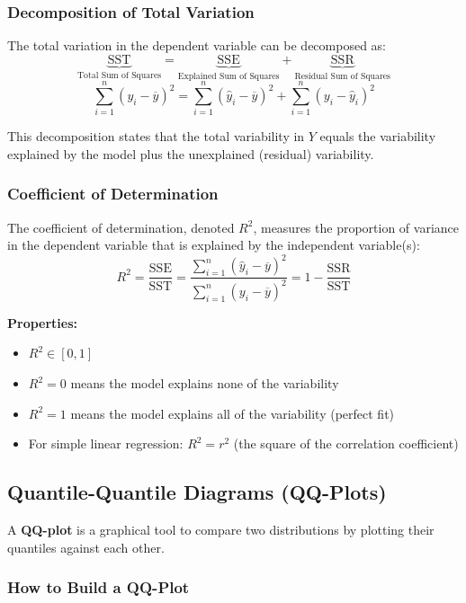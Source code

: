 \documentclass{article}
\begin{document}
\subsubsection{Decomposition of Total Variation}

The total variation in the dependent variable can be decomposed as:
\[
\underbrace{\text{SST}}_{\text{Total Sum of Squares}} = \underbrace{\text{SSE}}_{\text{Explained Sum of Squares}} + \underbrace{\text{SSR}}_{\text{Residual Sum of Squares}}
\]
\[
\sum_{i=1}^{n}(y_i - \overline{y})^2 = \sum_{i=1}^{n}(\hat{y}_i - \overline{y})^2 + \sum_{i=1}^{n}(y_i - \hat{y}_i)^2
\]

This decomposition states that the total variability in $Y$ equals the variability explained by the model plus the unexplained (residual) variability.

\subsubsection{Coefficient of Determination}

The coefficient of determination, denoted $R^2$, measures the proportion of variance in the dependent variable that is explained by the independent variable(s):
\[
R^2 = \frac{\text{SSE}}{\text{SST}} = \frac{\sum_{i=1}^{n}(\hat{y}_i - \overline{y})^2}{\sum_{i=1}^{n}(y_i - \overline{y})^2} = 1 - \frac{\text{SSR}}{\text{SST}}
\]

\textbf{Properties:}
\begin{itemize}
    \item $R^2 \in [0, 1]$
    \item $R^2 = 0$ means the model explains none of the variability
    \item $R^2 = 1$ means the model explains all of the variability (perfect fit)
    \item For simple linear regression: $R^2 = r^2$ (the square of the correlation coefficient)
\end{itemize}


\subsection{Quantile-Quantile Diagrams (QQ-Plots)}

A \textbf{QQ-plot} is a graphical tool to compare two distributions by plotting their quantiles against each other.

\subsubsection{How to Build a QQ-Plot}
\end{document}
